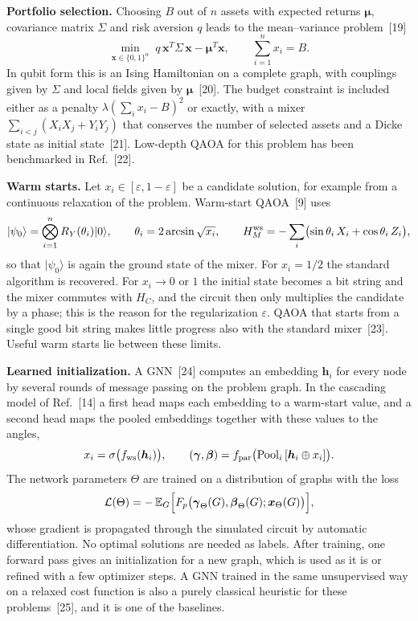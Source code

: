 \documentclass[12pt,a4paper]{article}
\begin{document}
\textbf{Portfolio selection.}  Choosing $B$ out of $n$ assets with
expected returns $\boldsymbol\mu$, covariance matrix $\Sigma$ and risk
aversion $q$ leads to the mean--variance problem~[19]
\[
  \min_{\boldsymbol x\in\{0,1\}^n}\;
  q\,\boldsymbol x^{T}\Sigma\,\boldsymbol x-\boldsymbol\mu^{T}\boldsymbol x ,
  \qquad \sum_{i=1}^{n}x_i=B .
\]
In qubit form this is an Ising Hamiltonian on a complete graph, with
couplings given by $\Sigma$ and local fields given by
$\boldsymbol\mu$~[20].  The budget constraint is included either as a
penalty $\lambda(\sum_ix_i-B)^2$ or exactly, with a mixer
$\sum_{i<j}(X_iX_j+Y_iY_j)$ that conserves the number of selected
assets and a Dicke state as initial state~[21].  Low-depth QAOA for
this problem has been benchmarked in Ref.~[22].

\textbf{Warm starts.}  Let $x_i\in[\varepsilon,1-\varepsilon]$ be a
candidate solution, for example from a continuous relaxation of the
problem.  Warm-start QAOA~[9] uses
\[
  |\psi_0\rangle=\bigotimes_{i=1}^{n}R_Y(\theta_i)|0\rangle,\qquad
  \theta_i=2\arcsin\sqrt{x_i},\qquad
  H_M^{\rm ws}=-\sum_{i}\bigl(\sin\theta_i\,X_i+\cos\theta_i\,Z_i\bigr),
\]
so that $|\psi_0\rangle$ is again the ground state of the mixer.  For
$x_i=1/2$ the standard algorithm is recovered.  For $x_i\to0$ or $1$
the initial state becomes a bit string and the mixer commutes with
$H_C$, and the circuit then only multiplies the candidate by a phase;
this is the reason for the regularization $\varepsilon$.  QAOA that
starts from a single good bit string makes little progress also with
the standard mixer~[23].  Useful warm starts lie between these limits.

\textbf{Learned initialization.}  A GNN~[24] computes an embedding
$\boldsymbol h_i$ for every node by several rounds of message passing
on the problem graph.  In the cascading model of Ref.~[14] a first
head maps each embedding to a warm-start value, and a second head maps
the pooled embeddings together with these values to the angles,
\[
  x_i=\sigma\bigl(f_{\rm ws}(\boldsymbol h_i)\bigr),\qquad
  (\boldsymbol\gamma,\boldsymbol\beta)
  =f_{\rm par}\bigl(\mathrm{Pool}_i\,[\boldsymbol h_i\oplus x_i]\bigr).
\]
The network parameters $\Theta$ are trained on a distribution of
graphs with the loss
\[
  \mathcal L(\Theta)=-\,\mathbb E_{G}\Bigl[
  F_p\bigl(\boldsymbol\gamma_\Theta(G),\boldsymbol\beta_\Theta(G);
  \boldsymbol x_\Theta(G)\bigr)\Bigr],
\]
whose gradient is propagated through the simulated circuit by
automatic differentiation.  No optimal solutions are needed as labels.
After training, one forward pass gives an initialization for a new
graph, which is used as it is or refined with a few optimizer steps.
A GNN trained in the same unsupervised way on a relaxed cost function
is also a purely classical heuristic for these problems~[25], and it
is one of the baselines.
\end{document}
